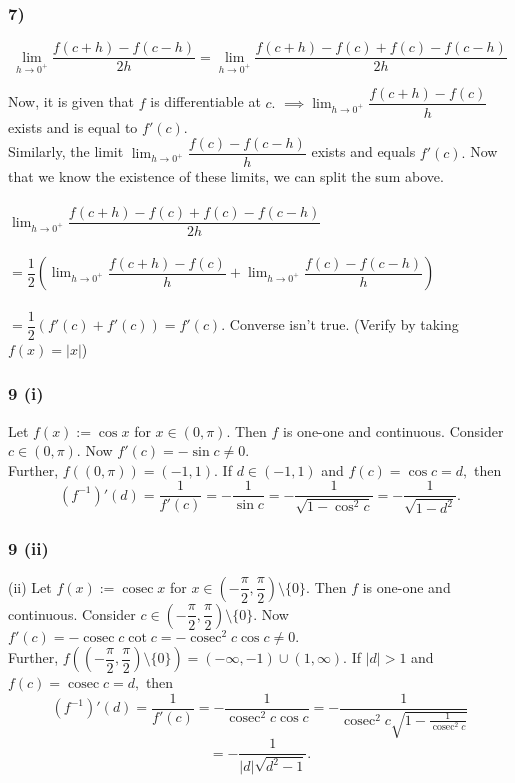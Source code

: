 \documentclass[handout]{beamer}
\newcommand{\cosec}{\operatorname{cosec}}
\begin{document}
\begin{frame}
\frametitle{7)}
\[\lim_{h\to 0^+}\dfrac{f(c + h) - f(c - h)}{2h}%
		= \lim_{h\to 0^+}\dfrac{f(c + h) - f(c) + f(c) - f(c - h)}{2h}\]

Now, it is given that $f$ is differentiable at $c.$ $\implies \displaystyle\lim_{h\to 0^+}\dfrac{f(c + h) - f(c)}{h}$ exists and is equal to $f'(c).$\\
Similarly, the limit $\displaystyle\lim_{h\to 0^+}\dfrac{f(c) - f(c-h)}{h}$ exists and equals $f'(c).$ Now that we know the existence of these limits, we can split the sum above.\\~\\
$\displaystyle\lim_{h\to 0^+}\dfrac{f(c + h) - f(c) + f(c) - f(c - h)}{2h}$\\~\\
$=\displaystyle\dfrac{1}{2}\left(\lim_{h\to 0^+}\dfrac{f(c + h) - f(c)}{h} + \lim_{h\to 0^+}\dfrac{f(c) - f(c - h)}{h}\right)$\\~\\
$=\dfrac{1}{2}\left(f'(c) + f'(c)\right) = f'(c).$ Converse isn't true. (Verify by taking $f(x)=|x|$)
\end{frame}

\begin{frame}
\frametitle{9 (i)}
Let $f(x) := \cos x$ for $x \in (0, \pi).$ 
Then $f$ is one-one and continuous. Consider $c \in (0, \pi).$ Now $f'(c) = -\sin c \neq 0.$\\
	Further, $f\left((0, \pi)\right) = (-1, 1).$ If $d \in (-1, 1)$ and $f(c) = \cos c = d,$ then
	\[(f^{-1})'(d) = \dfrac{1}{f'(c)} = -\dfrac{1}{\sin c} = - \dfrac{1}{\sqrt{1 - \cos^2c}} = - \dfrac{1}{\sqrt{1 - d^2}}.\]
\end{frame}

\begin{frame}
\frametitle{9 (ii)}
(ii) Let $f(x) := \cosec x$ for $x \in \left(-\dfrac{\pi}{2}, \dfrac{\pi}{2}\right)\setminus\{0\}.$ Then $f$ is one-one and continuous. Consider $c \in \left(-\dfrac{\pi}{2}, \dfrac{\pi}{2}\right)\setminus\{0\}.$ Now $f'(c) = -\cosec c\cot c = -\cosec^2 c\cos c \neq 0.$\\
	Further, $f\left(\left(-\dfrac{\pi}{2}, \dfrac{\pi}{2}\right)\setminus\{0\}\right) = (-\infty, -1)\cup(1, \infty).$ If $|d| > 1$ and $f(c) = \cosec c= d,$ then
	\[(f^{-1})'(d) = \dfrac{1}{f'(c)} = - \dfrac{1}{\cosec^2 c \cos c} = - \dfrac{1}{\cosec^2 c \sqrt{1 - \frac{1}{\cosec^2 c}}} \]
    \[= - \dfrac{1}{|d|\sqrt{d^2 - 1}}.\]
\end{frame}
\end{document}
